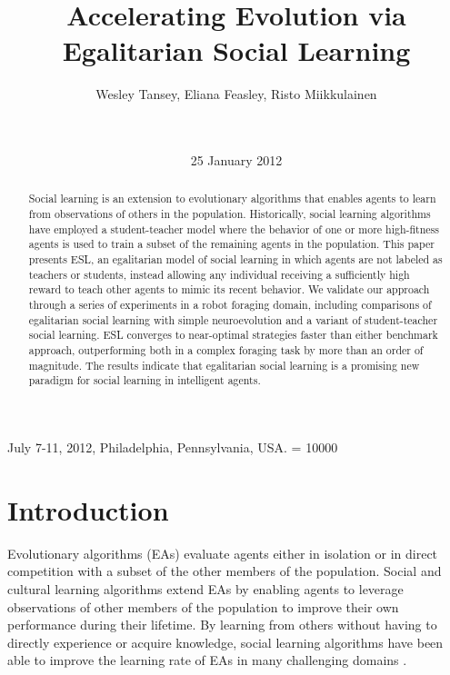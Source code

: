 \documentclass{sig-alternate}
\begin{document}
 {July 7-11, 2012, Philadelphia, Pennsylvania, USA.}
\widowpenalty = 10000
    
\title{Accelerating Evolution via Egalitarian Social Learning}

\author{
\alignauthor
Wesley Tansey, Eliana Feasley, Risto Miikkulainen\\
       \\
       \\
}
\date{25 January 2012}

\maketitle
\begin{abstract}
Social learning is an extension to evolutionary algorithms that enables agents to learn from observations of others in the population. Historically, social learning algorithms have employed a student-teacher model where the behavior of one or more high-fitness agents is used to train a subset of the remaining agents in the population. This paper presents ESL, an egalitarian model of social learning in which agents are not labeled as teachers or students, instead allowing any individual receiving a sufficiently high reward to teach other agents to mimic its recent behavior. We validate our approach through a series of experiments in a robot foraging domain, including comparisons of egalitarian social learning with simple neuroevolution and a variant of student-teacher social learning. ESL converges to near-optimal strategies faster than either benchmark approach, outperforming both in a complex foraging task by more than an order of magnitude. The results indicate that egalitarian social learning is a promising new paradigm for social learning in intelligent agents.
\end{abstract}


\section{Introduction}

Evolutionary algorithms (EAs) \cite{fogel1966artificial} evaluate agents either in isolation or in direct competition with a subset of the other members of the population. Social and cultural learning algorithms \cite{reynolds1994introduction} extend EAs by enabling agents to leverage observations of other members of the population to improve their own performance during their lifetime. By learning from others without having to directly experience or acquire knowledge, social learning algorithms have been able to improve the learning rate of EAs in many challenging domains \cite{denaro1996cultural, haasdijk2008social, vogt2010modeling, acerbi2007social, de2011incremental, watkins1992q}.
\end{document}
